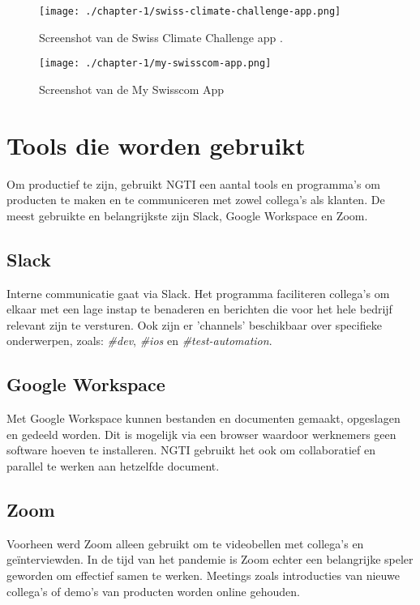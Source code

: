 \begin{figure}[hbt!]
  \centering
  \begin{minipage}{0.45\textwidth}
      \centering
      \texttt{[image: ./chapter-1/swiss-climate-challenge-app.png]}
      \caption{Screenshot van de Swiss Climate Challenge app \cite{ngti-swisscom-climate-challenge}.}
      \label{fig:swiss-climate-challenge-app}
  \end{minipage}\hfill
  \begin{minipage}{0.45\textwidth}
      \centering
      \texttt{[image: ./chapter-1/my-swisscom-app.png]}
      \caption{Screenshot van de My Swisscom App \cite{ngti-my-swisscom-app}}
      \label{fig:my-swisscom-app}
  \end{minipage}
\end{figure}


\section{Tools die worden gebruikt}\label{sec:tools-die-gebruikt-worden}
Om productief te zijn, gebruikt NGTI een aantal tools en programma's om producten te maken en te communiceren met zowel collega's als klanten. De meest gebruikte en belangrijkste zijn Slack, Google Workspace en Zoom.

\subsection{Slack}\label{subsec:slack}
Interne communicatie gaat via Slack. Het programma faciliteren collega's om elkaar met een lage instap te benaderen en berichten die voor het hele bedrijf relevant zijn te versturen. Ook zijn er 'channels' beschikbaar over specifieke onderwerpen, zoals: \textit{\#dev}, \textit{\#ios} en \textit{\#test-automation}.

\subsection{Google Workspace}\label{subsec:google-workspace}
Met Google Workspace kunnen bestanden en documenten gemaakt, opgeslagen en gedeeld worden. Dit is mogelijk via een browser waardoor werknemers geen software hoeven te installeren. NGTI gebruikt het ook om collaboratief en parallel te werken aan hetzelfde document.

\subsection{Zoom}\label{subsec:zoom}
Voorheen werd Zoom alleen gebruikt om te videobellen met collega's en geïnterviewden. In de tijd van het pandemie is Zoom echter een belangrijke speler geworden om effectief samen te werken. Meetings zoals introducties van nieuwe collega's of demo's van producten worden online gehouden.

